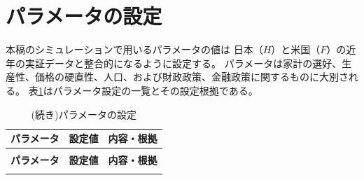 
\section{パラメータの設定}
\label{sec:model_preparation_parameters_main}

本稿のシミュレーションで用いるパラメータの値は
日本（\(H\)）と米国（\(F\)）の近年の実証データと整合的になるように設定する。
パラメータは家計の選好、生産性、価格の硬直性、人口、および財政政策、金融政策に関するものに大別される。
表\ref{tab:model_preparation_parameters_list}はパラメータ設定の一覧とその設定根拠である。

\begin{longtable}{@{}p{2.3cm}p{1.8cm}p{\dimexpr\textwidth-4.1cm-4\tabcolsep\relax}@{}}
  \caption{パラメータの設定} \label{tab:model_preparation_parameters_list} \\
  \toprule
  \textbf{パラメータ} & \textbf{設定値} & \textbf{内容・根拠} \\
  \midrule
\endfirsthead

  \caption[]{(続き)パラメータの設定} \\
  \toprule
  \textbf{パラメータ} & \textbf{設定値} & \textbf{内容・根拠} \\
  \midrule
\endhead

  \bottomrule
\endlastfoot


\end{longtable}
